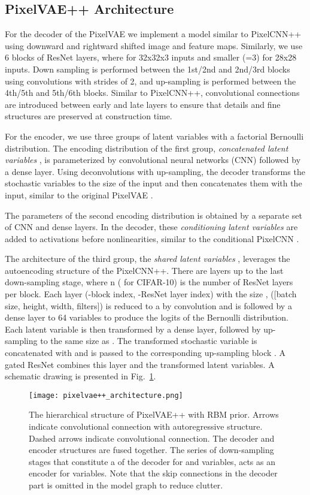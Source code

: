\documentclass{article}
\begin{document}
\subsection{PixelVAE++ Architecture}
For the decoder of the PixelVAE we implement a model similar to PixelCNN++ \cite{salimans2017pixelcnn++} using downward and rightward shifted image and feature maps. Similarly, we use 6 blocks of  ResNet layers, where  for 32x32x3 inputs and smaller (=3) for 28x28 inputs. Down sampling is performed between the 1st/2nd and 2nd/3rd blocks using convolutions with strides of 2, and up-sampling is performed between the 4th/5th and 5th/6th blocks. Similar to PixelCNN++, convolutional connections are introduced between early and late layers to ensure that details and fine structures are preserved at construction time. 

For the encoder, we use three groups of latent variables with a factorial Bernoulli distribution. The encoding distribution of the first group, \textit{concatenated latent variables} , is parameterized by convolutional neural networks (CNN) followed by a dense layer. Using deconvolutions with up-sampling, the decoder transforms the stochastic variables to the size of the input and then concatenates them with the input, similar to the original PixelVAE \cite{gulrajani2016pixelvae}.

The parameters of the second encoding distribution is obtained by a separate set of CNN and dense layers. In the decoder, these \textit{conditioning latent variables}  are added to activations before nonlinearities, similar to the conditional PixelCNN \cite{van2016conditional}.

The architecture of the third group, the {\it shared latent variables} , leverages the autoencoding structure of the PixelCNN++. There are  layers up to the last down-sampling stage, where n ( for CIFAR-10) is the number of ResNet layers per block. Each layer  (-block index, -ResNet layer index) with the size , ([batch size, height, width, filters]) is reduced to a  by convolution and is followed by a dense layer to 64 variables to produce the logits of the Bernoulli distribution. Each latent variable is then transformed by a dense layer, followed by up-sampling to the same size as . The transformed stochastic variable is concatenated with  and is passed to the corresponding up-sampling block . A gated ResNet combines this layer and the transformed latent variables. A schematic drawing is presented in Fig.~\ref{generativeform}.


\begin{figure}[h]
 \centering
  \texttt{[image: pixelvae++\_architecture.png]}
\caption{The hierarchical structure of PixelVAE++ with RBM prior. Arrows indicate convolutional connection with autoregressive structure. Dashed arrows indicate convolutional connection. The decoder and encoder structures are fused together. The series of down-sampling stages that constitute a of the decoder for  and  variables, acts as an encoder for  variables. Note that the skip connections in the decoder part is omitted in the model graph to reduce clutter.}
  \label{generativeform}
\end{figure}
\end{document}
